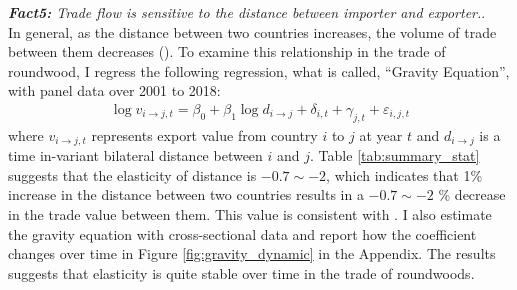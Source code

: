 \documentclass[a4paper,12pt]{article}
\begin{document}
   \textit{\textbf{Fact5:} Trade flow is sensitive to the distance between importer and exporter.}.\\
   In general, as the distance between two countries increases, the volume of trade between them decreases (\cite{allen201813}). To examine this relationship in the trade of roundwood, I regress the following regression, what is called, ``Gravity Equation'', with panel data over 2001 to 2018:
   \begin{align}
    \log v_{i \to j, t} = \beta_0 + \beta_1 \log d_{i \to j} + \delta_{i, t} + \gamma_{j, t} + \varepsilon_{i,j,t}
   \end{align}
   where $v_{i \to j, t}$ represents export value from country $i$ to $j$ at year $t$ and $d_{i \to j}$ is a time in-variant bilateral distance between $i$ and $j$. Table \ref{tab:summary_stat} suggests that the elasticity of distance is $-0.7 \sim -2$, which indicates that 1\% increase in the distance between two countries results in a $-0.7 \sim -2$ \% decrease in the trade value between them. This value is consistent with \cite{allen201813}. I also estimate the gravity equation with cross-sectional data and report how the coefficient changes over time in Figure \ref{fig:gravity_dynamic} in the Appendix. The results suggests that elasticity is quite stable over time in the trade of roundwoods.\\
\end{document}
